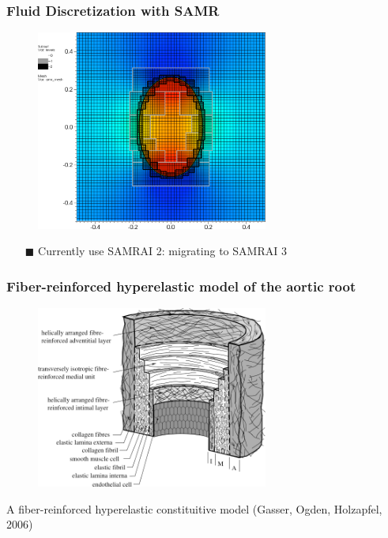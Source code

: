 \documentclass[8pt]{beamer}
\begin{document}
\begin{frame}
    \frametitle{Fluid Discretization with SAMR}
    \begin{figure}
        \includegraphics[width=3in]{curve2d_levels_mesh-93-361.png}
    \end{figure}
    \begin{itemize}
        \item[$\blacksquare$] Currently use SAMRAI 2: migrating to SAMRAI 3
    \end{itemize}
\end{frame}

\begin{frame}
    \frametitle{Fiber-reinforced hyperelastic model of the aortic root}
    \begin{figure}
        \includegraphics[width=3in]{vessel_schematic-904.png}
    \end{figure}
    A fiber-reinforced hyperelastic constituitive model (Gasser, Ogden,
    Holzapfel, 2006)
\end{frame}
\end{document}
